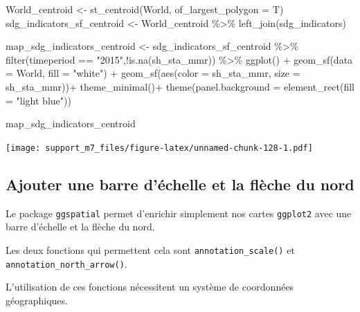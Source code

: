 \documentclass[
]{book}
\newenvironment{Shaded}{\begin{snugshade}}{\end{snugshade}}
\newcommand{\AttributeTok}[1]{\textcolor[rgb]{0.77,0.63,0.00}{#1}}
\newcommand{\FunctionTok}[1]{\textcolor[rgb]{0.00,0.00,0.00}{#1}}
\newcommand{\NormalTok}[1]{#1}
\newcommand{\OtherTok}[1]{\textcolor[rgb]{0.56,0.35,0.01}{#1}}
\newcommand{\SpecialCharTok}[1]{\textcolor[rgb]{0.00,0.00,0.00}{#1}}
\newcommand{\StringTok}[1]{\textcolor[rgb]{0.31,0.60,0.02}{#1}}
\begin{document}
\begin{Shaded}
\begin{Highlighting}[]
\NormalTok{World\_centroid }\OtherTok{\textless{}{-}} \FunctionTok{st\_centroid}\NormalTok{(World, }\AttributeTok{of\_largest\_polygon =}\NormalTok{ T)}
\NormalTok{sdg\_indicators\_sf\_centroid }\OtherTok{\textless{}{-}}\NormalTok{ World\_centroid }\SpecialCharTok{\%\textgreater{}\%}
  \FunctionTok{left\_join}\NormalTok{(sdg\_indicators)}

\NormalTok{map\_sdg\_indicators\_centroid }\OtherTok{\textless{}{-}}\NormalTok{ sdg\_indicators\_sf\_centroid }\SpecialCharTok{\%\textgreater{}\%} 
  \FunctionTok{filter}\NormalTok{(timeperiod }\SpecialCharTok{==} \StringTok{"2015"}\NormalTok{,}\SpecialCharTok{!}\FunctionTok{is.na}\NormalTok{(sh\_sta\_mmr)) }\SpecialCharTok{\%\textgreater{}\%} 
  \FunctionTok{ggplot}\NormalTok{() }\SpecialCharTok{+}
  \FunctionTok{geom\_sf}\NormalTok{(}\AttributeTok{data =}\NormalTok{ World, }\AttributeTok{fill =} \StringTok{"white"}\NormalTok{) }\SpecialCharTok{+}
  \FunctionTok{geom\_sf}\NormalTok{(}\FunctionTok{aes}\NormalTok{(}\AttributeTok{color =}\NormalTok{ sh\_sta\_mmr, }\AttributeTok{size =}\NormalTok{ sh\_sta\_mmr))}\SpecialCharTok{+}
  \FunctionTok{theme\_minimal}\NormalTok{()}\SpecialCharTok{+}
  \FunctionTok{theme}\NormalTok{(}\AttributeTok{panel.background =} \FunctionTok{element\_rect}\NormalTok{(}\AttributeTok{fill =} \StringTok{"light blue"}\NormalTok{))}

\NormalTok{map\_sdg\_indicators\_centroid}
\end{Highlighting}
\end{Shaded}

\texttt{[image: support\_m7\_files/figure-latex/unnamed-chunk-128-1.pdf]}

\hypertarget{ajouter-une-barre-duxe9chelle-et-la-fluxe8che-du-nord}{%
\subsection{Ajouter une barre d'échelle et la flèche du nord}\label{ajouter-une-barre-duxe9chelle-et-la-fluxe8che-du-nord}}

Le package \texttt{ggspatial} permet d'enrichir simplement nos cartes \texttt{ggplot2} avec une barre d'échelle et la flèche du nord.

Les deux fonctions qui permettent cela sont \texttt{annotation\_scale()} et \texttt{annotation\_north\_arrow()}.

L'utilisation de ces fonctions nécessitent un système de coordonnées géographiques.
\end{document}
